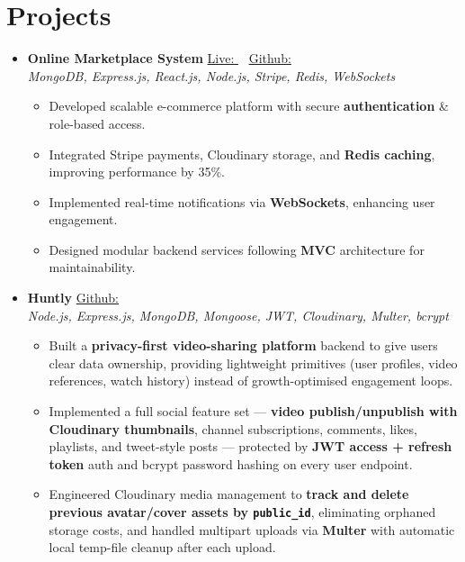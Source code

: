 
\section*{Projects}
\begin{itemize}

\item \textbf{Online Marketplace System}
\href{https://e-commerce-4png.onrender.com/}{Live: \faExternalLink} ~
\href{https://github.com/Ank0it/Online-Marketplace-System}{Github: \faGithub} \\
\textit{MongoDB, Express.js, React.js, Node.js, Stripe, Redis, WebSockets}
\begin{itemize}
    \item Developed scalable e-commerce platform with secure \textbf{authentication} \& role-based access.
    \item Integrated Stripe payments, Cloudinary storage, and \textbf{Redis caching}, improving performance by 35\%.
    \item Implemented real-time notifications via \textbf{WebSockets}, enhancing user engagement.
    \item Designed modular backend services following \textbf{MVC} architecture for maintainability.
\end{itemize}

\item \textbf{Huntly}
\href{https://github.com/Ank0it/Huntly}{Github: \faGithub} \\
\textit{Node.js, Express.js, MongoDB, Mongoose, JWT, Cloudinary, Multer, bcrypt}
\begin{itemize}
    \item Built a \textbf{privacy-first video-sharing platform} backend to give users clear data ownership,
          providing lightweight primitives (user profiles, video references, watch history) instead of
          growth-optimised engagement loops.
    \item Implemented a full social feature set — \textbf{video publish/unpublish with Cloudinary thumbnails},
          channel subscriptions, comments, likes, playlists, and tweet-style posts — protected by
          \textbf{JWT access + refresh token} auth and bcrypt password hashing on every user endpoint.
    \item Engineered Cloudinary media management to \textbf{track and delete previous avatar/cover assets
          by \texttt{public\_id}}, eliminating orphaned storage costs, and handled multipart uploads via
          \textbf{Multer} with automatic local temp-file cleanup after each upload.
\end{itemize}


\end{itemize}
